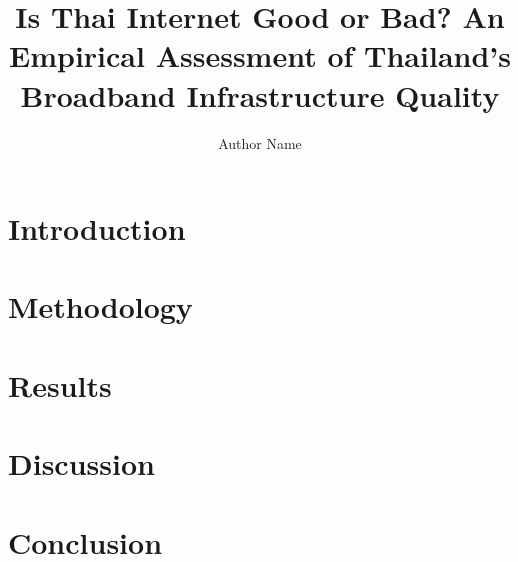 \documentclass[sigconf]{acmart}
\begin{document}
\title{Is Thai Internet Good or Bad? An Empirical Assessment of Thailand's Broadband Infrastructure Quality}

\author{Author Name}

\renewcommand{\shortauthors}{Author, et al.}

\begin{abstract}
\end{abstract}



\maketitle

\section{Introduction}

\section{Methodology}

\section{Results}

\section{Discussion}

\section{Conclusion}

\begin{acks}
\end{acks}
\end{document}
